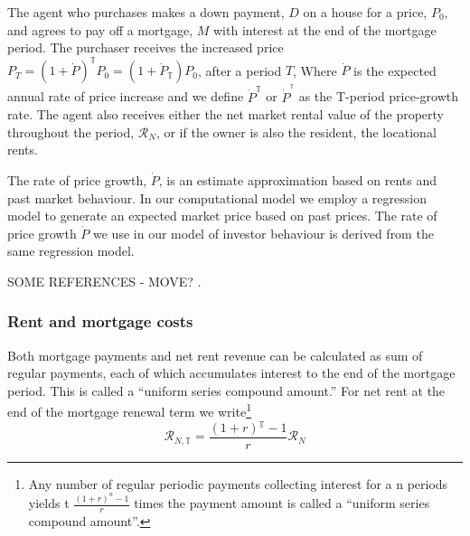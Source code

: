 {The agent who purchases makes a down payment, $D$ on a house for a price, $P_0$, and agrees to pay off a mortgage, $M$ with interest at the end of the mortgage period.  The purchaser  receives the increased price 
$P_T = (1 + \dot P)^\mathbb{T}P_0 =(1+\dot P_\mathbb{T})P_0 $, 
after a period $T$, Where $\dot P$  is the expected annual rate of price increase and we define $\dot P^\mathbb{T}$
or $\dot P^{^\mathbb{T}}$ 
as the T-period  price-growth rate. The agent also receives either the net market rental value of the property throughout the period, $\mathcal{R}_N$, or if the owner is also the resident, the locational rents. 
 



The rate of price growth, $\dot P$, is an estimate approximation based on rents and past market behaviour. In our computational model we employ a regression model to generate an \gls{expected market price} based on past prices. The rate of price growth $\dot P$ we use in our model of investor behaviour is derived from the same regression model.

SOME REFERENCES - MOVE? \cite{anselinModernSpatialEconometrics2014, gelmanDataAnalysisUsing2006}.


 
\subsubsection{Rent and mortgage costs}
Both mortgage payments and net rent revenue can be calculated as sum  of regular payments, each of which accumulates interest to the end of the mortgage period. This is called a ``uniform series compound amount.'' For net rent at the end of the mortgage renewal term we write\footnote{Any number of regular periodic payments collecting interest for a n periods yields t  $\frac{(1+r)^n-1}{r}$ times the payment amount is called a  ``uniform series compound amount''.%
} 
\begin{equation}
\mathcal{R}_{N, \mathbb{T}}= \frac{(1+r)\mathbb{^\mathbb{T}}-1}{r}\mathcal{R}_N     
\end{equation}




}

